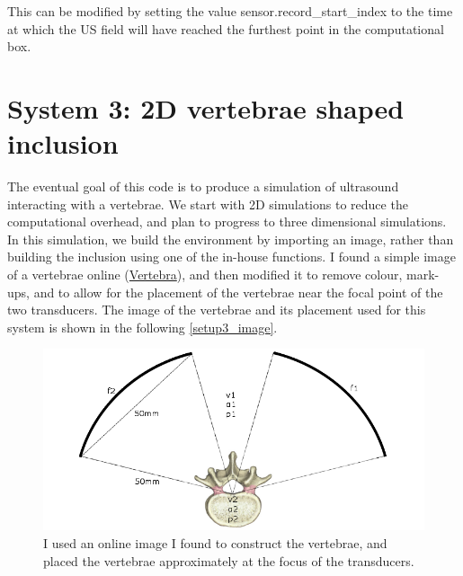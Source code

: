 \documentclass[10pt,a4paper]{article}
\begin{document}
This can be modified by setting the value sensor.record\_start\_index to the time at which the US field will have reached the furthest point in the computational box. 


\section*{System 3: 2D vertebrae shaped inclusion}

The eventual goal of this code is to produce a simulation of ultrasound interacting with a vertebrae. We start with 2D simulations to reduce the computational overhead, and plan to progress to three dimensional simulations. In this simulation, we build the environment by importing an image, rather than building the inclusion using one of the in-house functions. I found a simple image of a vertebrae online (\href{https://www.cedars-sinai.edu/Patients/Programs-and-Services/Spine-Center/The-Patient-Guide/Anatomy-of-the-Spine/Vertebrae-of-the-Spine.aspx}{Vertebra}), and then modified it to remove colour, mark-ups, and to allow for the placement of the vertebrae near the focal point of the two transducers. The image of the vertebrae and its placement used for this system is shown in the following \autoref{setup3_image}.

\begin{figure}[H]
\centering
\includegraphics[scale=0.5]{setup3.png}
\caption{I used an online image I found to construct the vertebrae, and placed the vertebrae approximately at the focus of the transducers.}\label{setup3_image}
\end{figure}
\end{document}
